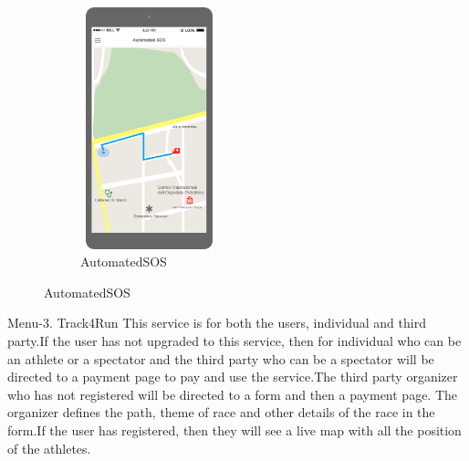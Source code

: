 \begin{figure}[H]
	\centering
	\begin{subfigure}[b]{0.4\textwidth}	
		\includegraphics[width=4cm,height=7cm]		{./RASD_Mockups/8_I-AutomatedSOS.png}
      	\caption{AutomatedSOS}
        \label{TrackMe_AutomatedSOS}
	 \end{subfigure}
\end{figure}

Menu-3. Track4Run\newline
This service is for both the users, individual and third party.\newline If the user has not upgraded to this service, then for individual who can be an athlete or a spectator and the third party who can be a spectator will be directed to a payment page to pay and use the service.\newline The third party organizer who has not registered will be directed to a form and then a payment page. The organizer defines the path, theme of race and other details of the race in the form.\newline If the user has registered, then they will see a live map with all the position of the athletes.

